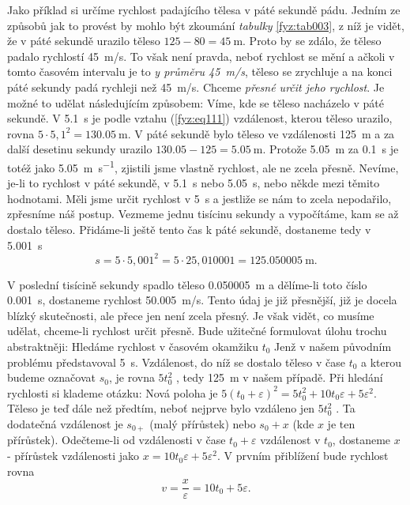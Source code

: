     Jako příklad si určíme rychlost padajícího tělesa v páté sekundě pádu. Jedním ze způsobů jak to 
    provést by mohlo být zkoumání \emph{tabulky} \ref{fyz:tab003}, z níž je vidět, že v páté 
    sekundě urazilo těleso \(125 - 80 = \qty{45}{\m}\). Proto by se zdálo, že těleso padalo 
    rychlostí \qty{45}{\m/\s}. To však není pravda, neboť rychlost se mění a ačkoli v tomto časovém 
    intervalu je to \emph{y průměru \qty{45}{\m/\s}}, těleso se zrychluje a na konci páté sekundy 
    padá rychleji než \qty{45}{\m/\s}. Chceme \emph{přesné určit jeho rychlost}. Je možné to udělat 
    následujícím způsobem: Víme, kde se těleso nacházelo v páté sekundě. V \qty{5.1}{\s} je podle 
    vztahu (\ref{fyz:eq111}) vzdálenost, kterou těleso urazilo, rovna \(5\cdot5,1^2 = \qty{130.05} 
    {\m}\). V páté sekundě bylo těleso ve vzdálenosti \qty{125}{\m} a za další desetinu sekundy 
    urazilo \(\num{130.05} - \num{125} = \qty{5.05}{\m}\). Protože \qty{5.05}{\m} za \qty{0.1}{\s} je 
    totéž jako \qty{5.05}{\m\per\s}, zjistili jsme vlastně rychlost, ale ne zcela přesně. Nevíme, 
    je-li to rychlost v páté sekundě, v \qty{5.1}{\s} nebo \qty{5.05}{\s}, nebo někde mezi těmito 
    hodnotami. Měli jsme určit rychlost v \qty{5}{\s} a jestliže se nám to zcela nepodařilo, 
    zpřesníme náš postup. Vezmeme jednu tisícinu sekundy a vypočítáme, kam se až dostalo těleso. 
    Přidáme-li ještě tento čas k páté sekundě, dostaneme tedy v \qty{5.001}{\s}
    \begin{equation*}
      s = 5\cdot5,001^2 = 5\cdot25,010001 = \qty{125.050005}{\m}.
    \end{equation*}
    
    V poslední tisícině sekundy spadlo těleso \qty{0.050005}{\m} a dělíme-li toto číslo 
    \qty{0.001}{\s}, dostaneme rychlost \qty{50.005}{\m/\s}. Tento údaj je již přesnější, již je 
    docela blízký skutečnosti, ale přece jen není zcela přesný. Je však vidět, co musíme udělat, 
    chceme-li rychlost určit přesně. Bude užitečné formulovat úlohu trochu abstraktněji: Hledáme 
    rychlost v časovém okamžiku \(t_0\) Jenž v našem původním problému představoval \qty{5}{\s}. 
    Vzdálenost, do níž se dostalo těleso v čase \(t_0\) a kterou budeme označovat \(s_0\), je rovna 
    \(5t_0^2\) , tedy \qty{125}{\m} v našem případě. Při hledání rychlosti si klademe otázku: 
     Nová poloha 
    je \(5(t_0 + \varepsilon)^2 = 5t_0^2 + 10t_0\varepsilon + 5\varepsilon^2\). Těleso je teď dále 
    než předtím, neboť nejprve bylo vzdáleno jen \(5t_0^2\) . Ta dodatečná vzdálenost je \(s_{0+}\) 
    (malý přírůstek) nebo \(s_0 + x\) (kde \(x\) je ten přírůstek). Odečteme-li od vzdálenosti 
    v čase \(t_0 + \varepsilon\) vzdálenost v \(t_0\), dostaneme \(x\) - přírůstek vzdálenosti jako 
    \(x = 10t_0\varepsilon +5\varepsilon^2\). V prvním přiblížení bude rychlost rovna
    \begin{equation}\label{fyz:eq116}
      v = \frac{x}{\varepsilon} = 10t_0 +5\varepsilon.
    \end{equation}
    
